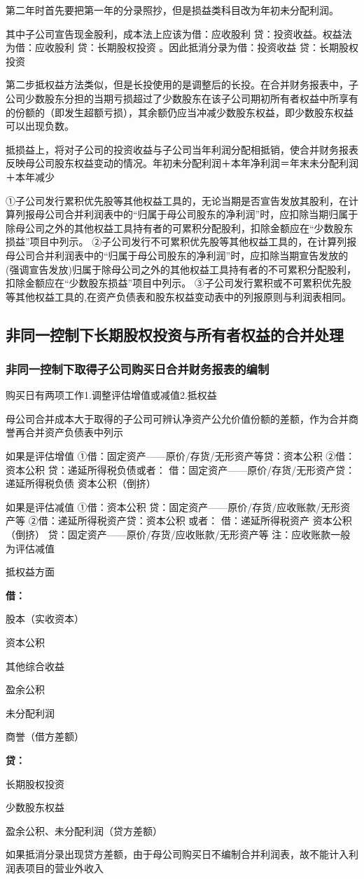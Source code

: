 \documentclass[UTF8,12pt]{ctexart}
\newenvironment{Dr}{%
	\begin{list}{}%
		{
			\setlength{\leftmargin}{2em}
			\setlength{\labelwidth}{2em}
			\setlength{\labelsep}{0pt}
			\setlength{\itemindent}{0pt}
			\setlength{\listparindent}{0pt}
			\setlength{\parsep}{0pt}
			\setlength{\topsep}{0pt}
		}
		\item[\textbf{借：}]
	}{%
	\end{list}
}
\newenvironment{Cr}{%
	\begin{list}{}%
		{
			\setlength{\leftmargin}{2em}
			\setlength{\labelwidth}{2em}
			\setlength{\labelsep}{0pt}
			\setlength{\itemindent}{0pt}
			\setlength{\listparindent}{0pt}
			\setlength{\parsep}{0pt}
			\setlength{\topsep}{0pt}
		}
		\item[\textbf{贷：}]
	}{%
	\end{list}
}
\numberwithin{equation}{section} %
\numberwithin{figure}{section}
\numberwithin{table}{section}
\begin{document}
	第二年时首先要把第一年的分录照抄，但是损益类科目改为年初未分配利润。
	
	其中子公司宣告现金股利，成本法上应该为借：应收股利 贷：投资收益。权益法为借：应收股利
	贷：长期股权投资
	。因此抵消分录为借：投资收益
	贷：长期股权投资
	
	第二步抵权益方法类似，但是长投使用的是调整后的长投。在合并财务报表中，子公司少数股东分担的当期亏损超过了少数股东在该子公司期初所有者权益中所享有的份额的（即发生超额亏损），其余额仍应当冲减少数股东权益，即少数股东权益可以出现负数。
	
	抵损益上，将对子公司的投资收益与子公司当年利润分配相抵销，使合并财务报表反映母公司股东权益变动的情况。年初未分配利润＋本年净利润＝年末未分配利润＋本年减少
	
	①子公司发行累积优先股等其他权益工具的，无论当期是否宣告发放其股利，在计算列报母公司合并利润表中的“归属于母公司股东的净利润”时，应扣除当期归属于除母公司之外的其他权益工具持有者的可累积分配股利，扣除金额应在“少数股东损益”项目中列示。
	②子公司发行不可累积优先股等其他权益工具的，在计算列报母公司合并利润表中的“归属于母公司股东的净利润”时，应扣除当期宣告发放的(强调宣告发放)归属于除母公司之外的其他权益工具持有者的不可累积分配股利，扣除金额应在“少数股东损益”项目中列示。
	③子公司发行累积或不可累积优先股等其他权益工具的,在资产负债表和股东权益变动表中的列报原则与利润表相同。
	
	\subsection{非同一控制下长期股权投资与所有者权益的合并处理}
	
	\subsubsection{非同一控制下取得子公司购买日合并财务报表的编制}
	购买日有两项工作1.调整评估增值或减值2.抵权益
	
	母公司合并成本大于取得的子公司可辨认净资产公允价值份额的差额，作为合并商誉再合并资产负债表中列示
	
	如果是评估增值
	①借：固定资产——原价/存货/无形资产等贷：资本公积
	②借：资本公积
	贷：递延所得税负债或者：
	借：固定资产——原价/存货/无形资产贷：递延所得税负债
	资本公积（倒挤）
	
	如果是评估减值
	①借：资本公积
	贷：固定资产——原价/存货/应收账款/无形资产等
	②借：递延所得税资产贷：资本公积
	或者：
	借：递延所得税资产 资本公积（倒挤）
	贷：固定资产——原价/存货/应收账款/无形资产等
	注：应收账款一般为评估减值
	
	抵权益方面
	\begin{Dr}
		股本（实收资本）
		
		资本公积
		
		其他综合收益
		
		盈余公积
		
		未分配利润
		
		商誉（借方差额）
	\end{Dr}
	\begin{Cr}
		长期股权投资
		
		少数股东权益
		
		盈余公积、未分配利润（贷方差额）
	\end{Cr}
	如果抵消分录出现贷方差额，由于母公司购买日不编制合并利润表，故不能计入利润表项目的营业外收入
\end{document}
